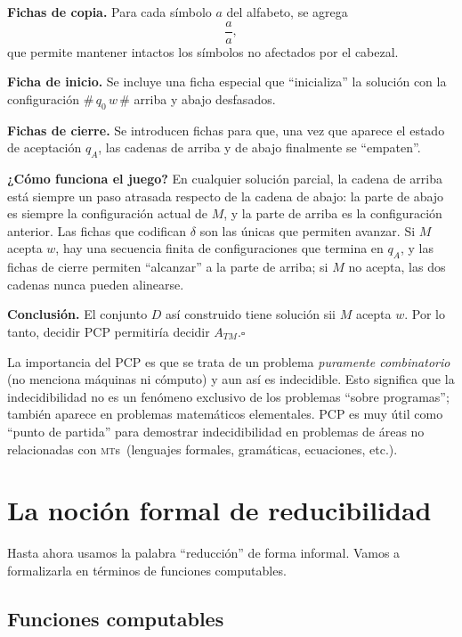 \documentclass[11pt,a4paper]{article}
\theoremstyle{definicion}
\newcommand{\MTs}{\textsc{mt}s}
\begin{document}
\textbf{Fichas de copia.} Para cada símbolo $a$ del alfabeto, se agrega
\[
\frac{a}{a},
\]
que permite mantener intactos los símbolos no afectados por el cabezal.

\textbf{Ficha de inicio.} Se incluye una ficha especial que ``inicializa'' la solución con la configuración $\#\, q_0\, w\, \#$ arriba y abajo desfasados.

\textbf{Fichas de cierre.} Se introducen fichas para que, una vez que aparece el estado de aceptación $q_A$, las cadenas de arriba y de abajo finalmente se ``empaten''.

\textbf{¿Cómo funciona el juego?} En cualquier solución parcial, la cadena de arriba está siempre un paso atrasada respecto de la cadena de abajo: la parte de abajo es siempre la configuración actual de $M$, y la parte de arriba es la configuración anterior. Las fichas que codifican $\delta$ son las únicas que permiten avanzar. Si $M$ acepta $w$, hay una secuencia finita de configuraciones que termina en $q_A$, y las fichas de cierre permiten ``alcanzar'' a la parte de arriba; si $M$ no acepta, las dos cadenas nunca pueden alinearse.

\textbf{Conclusión.} El conjunto $D$ así construido tiene solución sii $M$ acepta $w$. Por lo tanto, decidir PCP permitiría decidir $A_{TM}$.\hfill$\square$

\begin{intuicion}
La importancia del PCP es que se trata de un problema \emph{puramente combinatorio} (no menciona máquinas ni cómputo) y aun así es indecidible. Esto significa que la indecidibilidad no es un fenómeno exclusivo de los problemas ``sobre programas''; también aparece en problemas matemáticos elementales. PCP es muy útil como ``punto de partida'' para demostrar indecidibilidad en problemas de áreas no relacionadas con \MTs\ (lenguajes formales, gramáticas, ecuaciones, etc.).
\end{intuicion}

\section{La noción formal de reducibilidad}

Hasta ahora usamos la palabra ``reducción'' de forma informal. Vamos a formalizarla en términos de funciones computables.

\subsection{Funciones computables}
\end{document}
